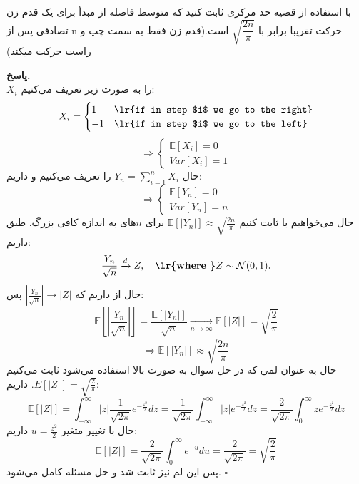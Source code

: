 \problem{}
با استفاده از قضیه حد مرکزی ثابت کنید که متوسط فاصله از مبدأ برای یک قدم زن تصادفی
پس از n حرکت تقریبا برابر با $\sqrt{\dfrac{2n}{\pi}}$ است.(قدم زن فقط به سمت چپ و راست حرکت میکند)

\textbf{پاسخ.}\\

$X_i$ را به صورت زیر تعریف می‌کنیم:
\[
	X_i = \begin{cases}
		1 & \text{\lr{if in step $i$ we go to the right}} \\
		-1 & \text{\lr{if in step $i$ we go to the left}}
	\end{cases}
\]
\[
	\Longrightarrow\begin{cases}
		\mathbb{E}[X_i] = 0 \\
		Var[X_i] = 1
	\end{cases}
\]
حال $Y_n = \sum_{i=1}^{n}X_i$ را تعریف می‌کنیم و داریم:
\[
	\Longrightarrow\begin{cases}
		\mathbb{E}[Y_n] = 0 \\
		Var[Y_n] = n
		\end{cases}
\]
حال می‌خواهیم با  ثابت کنیم $\mathbb{E}[|Y_n|] \approx \sqrt{\frac{2n}{\pi}}$ برای $n$های به اندازه کافی بزرگ. طبق  داریم:
\[
	\frac{Y_n}{\sqrt{n}} \xrightarrow{d} Z,
\quad \textbf{\lr{where }} Z \sim \mathcal{N}(0,1).
\]
حال از  داریم که $|\frac{Y_n}{\sqrt{n}}|\to |Z|$ پس:
\[
	\mathbb{E}[|\frac{Y_n}{\sqrt{n}}|] = \frac{\mathbb{E}[|Y_n|]}{\sqrt{n}} \underset{n\to \infty}{\longrightarrow} \mathbb{E}[|Z|] = \sqrt{\frac{2}{\pi}}
\]
\[
	\Longrightarrow \mathbb{E}[|Y_n|] \approx \sqrt{\frac{2n}{\pi}}
\]
حال به عنوان لمی که در حل سوال به صورت بالا استفاده می‌شود ثابت می‌کنیم $E[|Z|] = \sqrt{\frac{2}{\pi}}$. داریم:
\[
	\mathbb{E}[|Z|] = \int_{-\infty}^{\infty} |z| \frac{1}{\sqrt{2\pi}}e^{-\frac{z^2}{2}}dz = \frac{1}{\sqrt{2\pi}}\int_{-\infty}^{\infty} |z| e^{-\frac{z^2}{2}}dz = \frac{2}{\sqrt{2\pi}}\int_{0}^{\infty} ze^{-\frac{z^2}{2}}dz
\]
حال با تغییر متغیر $u=\frac{z^2}{2}$ داریم:
\[
	\mathbb{E}[|Z|] = \frac{2}{\sqrt{2\pi}}\int_{0}^{\infty} e^{-u}du = \frac{2}{\sqrt{2\pi}} = \sqrt{\frac{2}{\pi}}
\]
پس این لم نیز ثابت شد و حل مسئله کامل می‌شود. $\square$